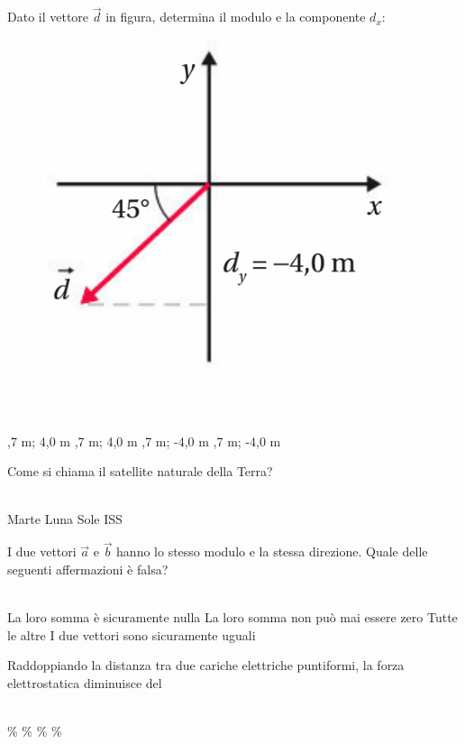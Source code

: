 \documentclass[a4paper,11pt]{exam}
\begin{document}
\begin{questions}
    
\question Dato il vettore $\vec{d}$ in figura, determina il modulo e la componente $d_x$: \begin{figure}[h!]   \begin{center}     \includegraphics[scale=0.35]{vettored.png}   \end{center} \end{figure}\\\
\begin{oneparchoices}
  ,7 m; 4,0 m
  ,7 m; 4,0 m
  \choice 5,7 m; -4,0 m
  ,7 m; -4,0 m
\end{oneparchoices}

    
\question Come si chiama il satellite naturale della Terra?\\\
\begin{oneparchoices}
  \choice Marte
  \choice Luna
  \choice Sole
  \choice ISS
\end{oneparchoices}

    
\question I due vettori $\vec{a}$ e $\vec{b}$ hanno lo stesso modulo e la stessa direzione. Quale delle seguenti affermazioni è falsa?\\\
\begin{oneparchoices}
  \choice La loro somma è sicuramente nulla
  \choice La loro somma non può mai essere zero
  \choice Tutte le altre
  \choice I due vettori sono sicuramente uguali
\end{oneparchoices}

    
\question Raddoppiando la distanza tra due cariche elettriche puntiformi, la forza elettrostatica diminuisce del\\\
\begin{oneparchoices}
  \choice 50\%
  \%
  \choice 75\%
  \choice 25\%
\end{oneparchoices}


\end{questions}
\end{document}
